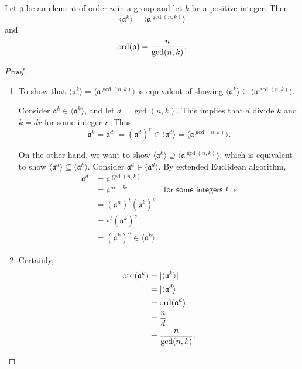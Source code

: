 \begin{theorem}
    Let $\mathfrak{a}$ be an element of order $n$ in a group and let $k$ be a positive integer. Then 
    \[
        \langle \mathfrak{a}^k \rangle = \langle \mathfrak{a}^{\gcd(n,k) } \rangle
    \]
    and 
    \[
        \operatorname{ord}(\mathfrak{a}) = \frac{n}{\gcd(n,k)}.
    \]
\end{theorem}
\begin{proof}
    \begin{enumerate}
        \item To show that $\langle \mathfrak{a}^k \rangle = \langle \mathfrak{a}^{\gcd(n,k) } \rangle$ is equivalent of showing 
        $\langle \mathfrak{a}^k \rangle \subseteq \langle \mathfrak{a}^{\gcd(n,k) } \rangle$.
    
        Consider $\mathfrak{a}^k \in \langle \mathfrak{a}^k \rangle$, and let $d = \gcd(n,k)$. This implies that $d$ divide $k$ and 
        $k = dr$ for some integer $r$. Thus 
        \[
            \mathfrak{a}^k = \mathfrak{a}^{dr} = (\mathfrak{a}^d)^r
            \in \langle \mathfrak{a}^d \rangle = \langle \mathfrak{a}^{\gcd(n,k)} \rangle.
        \]
    
        On the other hand, we want to show $\langle \mathfrak{a}^k \rangle \supseteq \langle \mathfrak{a}^{\gcd(n,k) } \rangle$, which is equivalent 
        to show $\langle \mathfrak{a}^d \rangle \subseteq \langle \mathfrak{a}^k \rangle$. Consider $\mathfrak{a}^d \in \langle \mathfrak{a}^d \rangle$.
        By extended Euclidean algorithm,
        \begin{align*}
            \mathfrak{a}^d &= \mathfrak{a}^{\gcd(n,k)}\\
            &= \mathfrak{a}^{nt+ks} & \textsf{for some integers }k,s\\
            &= (\mathfrak{a}^n)^t (\mathfrak{a}^k)^s\\
            &= e^t (\mathfrak{a}^k)^s\\
            &= (\mathfrak{a}^k)^s \in \langle \mathfrak{a}^k \rangle.
        \end{align*}

        \item Certainly, 
        \begin{align*}
            \operatorname{ord}(\mathfrak{a}^k) &= |\langle \mathfrak{a}^k \rangle|\\
            &= |\langle \mathfrak{a}^d \rangle|\\
            &= \operatorname{ord}(\mathfrak{a}^d)\\
            &= \frac{n}{d}\\
            &= \frac{n}{\gcd(n,k)}.
        \end{align*}
    \end{enumerate}
\end{proof}

